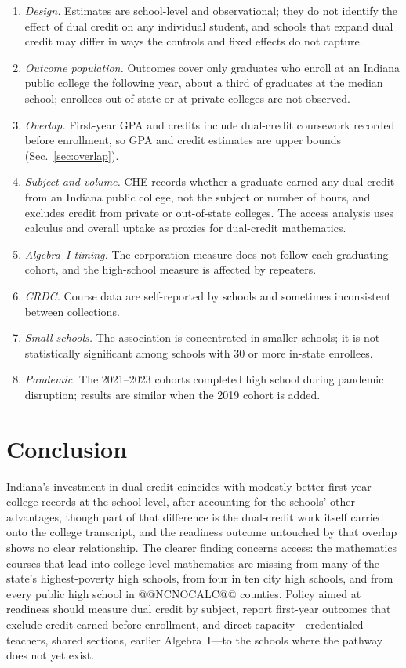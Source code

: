 \documentclass[aps,prd,reprint,superscriptaddress,nofootinbib,floatfix]{revtex4-2}
\begin{document}
\begin{enumerate}
\item \emph{Design.} Estimates are school-level and observational; they do not identify the effect of dual credit on any individual student, and schools that expand dual credit may differ in ways the controls and fixed effects do not capture.
\item \emph{Outcome population.} Outcomes cover only graduates who enroll at an Indiana public college the following year, about a third of graduates at the median school; enrollees out of state or at private colleges are not observed.
\item \emph{Overlap.} First-year GPA and credits include dual-credit coursework recorded before enrollment, so GPA and credit estimates are upper bounds (Sec.~\ref{sec:overlap}).
\item \emph{Subject and volume.} CHE records whether a graduate earned any dual credit from an Indiana public college, not the subject or number of hours, and excludes credit from private or out-of-state colleges. The access analysis uses calculus and overall uptake as proxies for dual-credit mathematics.
\item \emph{Algebra~I timing.} The corporation measure does not follow each graduating cohort, and the high-school measure is affected by repeaters.
\item \emph{CRDC.} Course data are self-reported by schools and sometimes inconsistent between collections.
\item \emph{Small schools.} The association is concentrated in smaller schools; it is not statistically significant among schools with 30 or more in-state enrollees.
\item \emph{Pandemic.} The 2021--2023 cohorts completed high school during pandemic disruption; results are similar when the 2019 cohort is added.
\end{enumerate}

\section{Conclusion}\label{sec:conclusion}

Indiana's investment in dual credit coincides with modestly better first-year college records at the school level, after accounting for the schools' other advantages, though part of that difference is the dual-credit work itself carried onto the college transcript, and the readiness outcome untouched by that overlap shows no clear relationship. The clearer finding concerns access: the mathematics courses that lead into college-level mathematics are missing from many of the state's highest-poverty high schools, from four in ten city high schools, and from every public high school in @@NCNOCALC@@ counties. Policy aimed at readiness should measure dual credit by subject, report first-year outcomes that exclude credit earned before enrollment, and direct capacity---credentialed teachers, shared sections, earlier Algebra~I---to the schools where the pathway does not yet exist.
\end{document}
